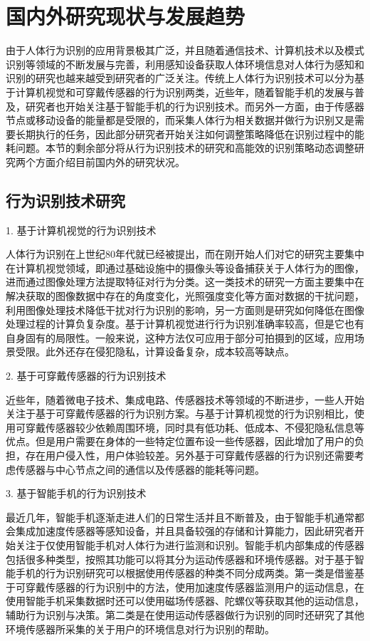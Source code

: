 \section{国内外研究现状与发展趋势}
由于人体行为识别的应用背景极其广泛，并且随着通信技术、计算机技术以及模式识别等领域的不断发展与完善，利用感知设备获取人体环境信息对人体行为感知和识别的研究也越来越受到研究者的广泛关注。传统上人体行为识别技术可以分为基于计算机视觉和可穿戴传感器的行为识别两类，近些年，随着智能手机的发展与普及，研究者也开始关注基于智能手机的行为识别技术。而另外一方面，由于传感器节点或移动设备的能量都是受限的，而采集人体行为相关数据并做行为识别又是需要长期执行的任务，因此部分研究者开始关注如何调整策略降低在识别过程中的能耗问题。本节的剩余部分将从行为识别技术的研究和高能效的识别策略动态调整研究两个方面介绍目前国内外的研究状况。

\subsection{行为识别技术研究}
    \par 1. 基于计算机视觉的行为识别技术
\par 人体行为识别在上世纪80年代就已经被提出，而在刚开始人们对它的研究主要集中在计算机视觉领域，即通过基础设施中的摄像头等设备捕获关于人体行为的图像，进而通过图像处理方法提取特征对行为分类。这一类技术的研究一方面主要集中在解决获取的图像数据中存在的角度变化，光照强度变化等方面对数据的干扰问题，利用图像处理技术降低干扰对行为识别的影响，另一方面则是研究如何降低在图像处理过程的计算负复杂度。基于计算机视觉进行行为识别准确率较高，但是它也有自身固有的局限性。一般来说，这种方法仅可应用于部分可拍摄到的区域，应用场景受限。此外还存在侵犯隐私，计算设备复杂，成本较高等缺点。
    \par 2. 基于可穿戴传感器的行为识别技术
\par 近些年，随着微电子技术、集成电路、传感器技术等领域的不断进步，一些人开始关注于基于可穿戴传感器的行为识别方案。与基于计算机视觉的行为识别相比，使用可穿戴传感器较少依赖周围环境，同时具有低功耗、低成本、不侵犯隐私信息等优点。但是用户需要在身体的一些特定位置布设一些传感器，因此增加了用户的负担，存在用户侵入性，用户体验较差。另外基于可穿戴传感器的行为识别还需要考虑传感器与中心节点之间的通信以及传感器的能耗等问题。
    \par 3. 基于智能手机的行为识别技术
\par 最近几年，智能手机逐渐走进人们的日常生活并且不断普及，由于智能手机通常都会集成加速度传感器等感知设备，并且具备较强的存储和计算能力，因此研究者开始关注于仅使用智能手机对人体行为进行监测和识别。智能手机内部集成的传感器包括很多种类型，按照其功能可以将其分为运动传感器和环境传感器。对于基于智能手机的行为识别研究可以根据使用传感器的种类不同分成两类。第一类是借鉴基于可穿戴传感器的行为识别中的方法，使用加速度传感器监测用户的运动信息，在使用智能手机采集数据时还可以使用磁场传感器、陀螺仪等获取其他的运动信息，辅助行为识别与决策。第二类是在使用运动传感器做行为识别的同时还研究了其他环境传感器所采集的关于用户的环境信息对行为识别的帮助。
